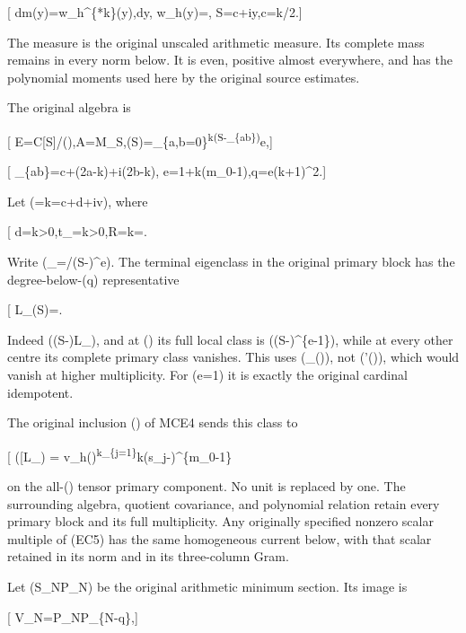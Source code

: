 {[} dm(y)=w\_h\^{}\{*k\}(y),dy, \qquad w\_h(y)=, \qquad S=c+iy,\quad c=k/2.{]}

The measure is the original unscaled arithmetic measure. Its complete mass remains in every norm below. It is even, positive almost everywhere, and has the polynomial moments used here by the original source estimates.

The original algebra is

{[} E=\mathbb C{[}S{]}/(\chi),\quad A=M\_S,\quad \chi(S)=\prod\_\{a,b=0\}\textsuperscript{k(S-\beta\_\{ab\})}e,{]}

{[} \beta\_\{ab\}=c+(2a-k)\delta+i(2b-k)\gamma, \qquad e=1+k(m\_0-1),\quad q=e(k+1)\^{}2.{]}

Let (\lambda=k\rho=c+d+iv), where

{[} d=k\delta\textgreater0,\quad t\_\lambda=k\gamma\textgreater0,\quad R=k=. \tag{EC4}{]}

Write (\chi\_\lambda=\chi/(S-\lambda)\^{}e). The terminal eigenclass in the original primary block has the degree-below-(q) representative

{[} L\_\lambda(S)=. \tag{EC5}{]}

Indeed ((S-\lambda)L\_\pmod\chi), and at (\lambda) its full local class is ((S-\lambda)\^{}\{e-1\}), while at every other centre its complete primary class vanishes. This uses (\chi\_\lambda(\lambda)), not (\chi'(\lambda)), which would vanish at higher multiplicity. For (e=1) it is exactly the original cardinal idempotent.

The original inclusion (\eta) of MCE4 sends this class to

{[} \eta({[}L\_\lambda{]}) = v\_h(\rho)\textsuperscript{k\prod\_\{j=1\}}k(s\_j-\rho)\^{}\{m\_0-1\} \tag{EC6}{]}

on the all-(\rho) tensor primary component. No unit is replaced by one. The surrounding algebra, quotient covariance, and polynomial relation retain every primary block and its full multiplicity. Any originally specified nonzero scalar multiple of (EC5) has the same homogeneous current below, with that scalar retained in its norm and in its three-column Gram.

Let (\mathscr S\_N\to\mathcal P\_N) be the original arithmetic minimum section. Its image is

{[} \mathcal V\_N=\mathcal P\_N\ominus\chi\mathcal P\_\{N-q\},{]}

